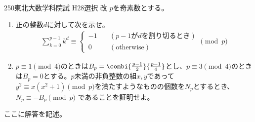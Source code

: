 \begin{thm}{250}{}{東北大数学科院試 H28選択 改}
 $p$を奇素数とする。
 \begin{enumerate}
  \item 正の整数$d$に対して次を示せ。
  \begin{align*}
   \sum_{k=0}^{p-1} k^d \equiv \left\{\,
   \begin{aligned}
    -1 & \quad(p-1\text{が}d\text{を割り切るとき}) \\
    0 & \quad(\text{otherwise})
   \end{aligned}
   \right.\!\!\! \pmod{p}
  \end{align*}
  \item $p\equiv 1\pmod{4}$のときは$B_p=\combi{\frac{p-1}{2}}{\frac{p-1}{4}}$とし、$p\equiv 3\pmod{4}$のときは$B_p=0$とする。$p$未満の非負整数の組$x,y$であって$y^2\equiv x(x^2+1) \pmod{p}$を満たすようなものの個数を$N_p$とするとき、$N_p\equiv -B_p \pmod{p}$ であることを証明せよ。
 \end{enumerate}
\end{thm}

ここに解答を記述。